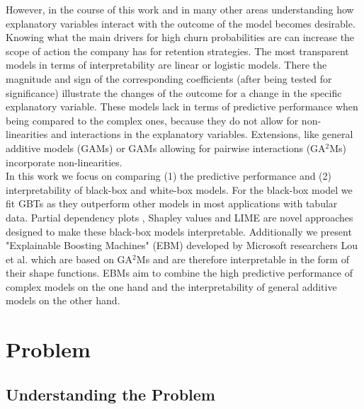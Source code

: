 \documentclass[12pt,titlepage]{article}
\begin{document}
However, in the course of this work and in many other areas understanding how explanatory variables interact with the outcome of the model becomes desirable. Knowing what the main drivers for high churn probabilities are can increase the scope of action the company has for retention strategies. The most transparent models in terms of interpretability are linear or logistic models. There the magnitude and sign of the corresponding coefficients (after being tested for significance) illustrate the changes of the outcome for a change in the specific explanatory variable. These models lack in terms of predictive performance when being compared to the complex ones, because they do not allow for non-linearities and interactions in the explanatory variables. Extensions, like general additive models (GAMs) \cite{gam} or GAMs allowing for pairwise interactions (GA$^{2}$Ms) \cite{ga2m} incorporate non-linearities.\\
In this work we focus on comparing (1) the predictive performance and (2) interpretability of black-box and white-box models. For the black-box model we fit GBTs \cite{gbt} as they outperform other models in most applications with tabular data. Partial dependency plots \cite{pdp}, Shapley values \cite{shap} and LIME \cite{lime} are novel approaches designed to make these black-box models interpretable. Additionally we present "Explainable Boosting Machines" (EBM) developed by Microsoft researchers Lou et al. \cite{interpretml} which are based on GA$^{2}$Ms and are therefore interpretable in the form of their shape functions. EBMs aim to combine the high predictive performance of complex models on the one hand and the interpretability of general additive models on the other hand. \\

\section{Problem} \par

\subsection{Understanding the Problem} \par
\end{document}
